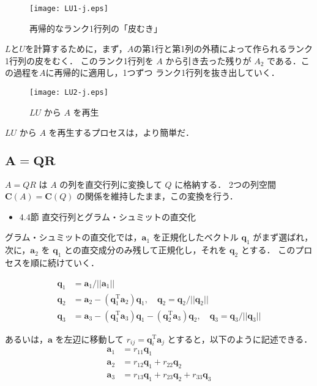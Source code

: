 \documentclass[letterpaper]{article}
\DeclareRobustCommand\transp{^{\mathrm{T}}}
\begin{document}
\begin{figure}[H]
  \centering
  \texttt{[image: LU1-j.eps]}
\caption{再帰的なランク1行列の「皮むき」}
\end{figure}

$L$と$U$を計算するために，まず，$A$の第1行と第1列の外積によって作られるランク1行列の皮をむく．
このランク1行列を $A$ から引き去った残りが $A_2$ である．この過程を$A$に再帰的に適用し，1つずつ
ランク1行列を抜き出していく．

\begin{figure}[H]
  \centering
  \texttt{[image: LU2-j.eps]}
\caption{$LU$ から $A$ を再生}
\end{figure}

$LU$ から $A$ を再生するプロセスは，より簡単だ．

\subsection{$\boldsymbol{A=QR}$}

$A=QR$ は $A$ の列を直交行列に変換して $Q$ に格納する．
2つの列空間 $\bm{C}(A) = \bm{C}(Q)$ の関係を維持したまま，この変換を行う．

\begin{itemize}
  \item 4.4節 直交行列とグラム・シュミットの直交化
\end{itemize}

グラム・シュミットの直交化では，$\bm{a}_1$ を正規化したベクトル $\bm{q}_1$ がまず選ばれ，
次に，$\bm{a}_2$ を $\bm{q}_1$ との直交成分のみ残して正規化し，それを $\bm{q}_2$ とする．
このプロセスを順に続けていく．

\begin{align*}
  \bm{q}_1 &= \bm{a}_1/||\bm{a}_1|| \\
  \bm{q}_2 &= \bm{a}_2 - (\bm{q}_1\transp \bm{a}_2)\bm{q}_1 , \quad \bm{q}_2 = \bm{q}_2/||\bm{q}_2|| \\
  \bm{q}_3 &= \bm{a}_3 - (\bm{q}_1\transp \bm{a}_3)\bm{q}_1 - (\bm{q}_2\transp \bm{a}_3)\bm{q}_2, \quad \bm{q}_3 = \bm{q}_3/||\bm{q}_3||
\end{align*}

あるいは，$\bm{a}$ を左辺に移動して $r_{ij} = \bm{q}_i\transp \bm{a}_j$ とすると，以下のように記述できる．
\begin{align*}
  \bm{a}_1 &= r_{11}\bm{q}_1\\
  \bm{a}_2 &= r_{12}\bm{q}_1 + r_{22} \bm{q}_2\\
  \bm{a}_3 &= r_{13}\bm{q}_1 + r_{23} \bm{q}_2 + r_{33} \bm{q}_3
\end{align*}
\end{document}
